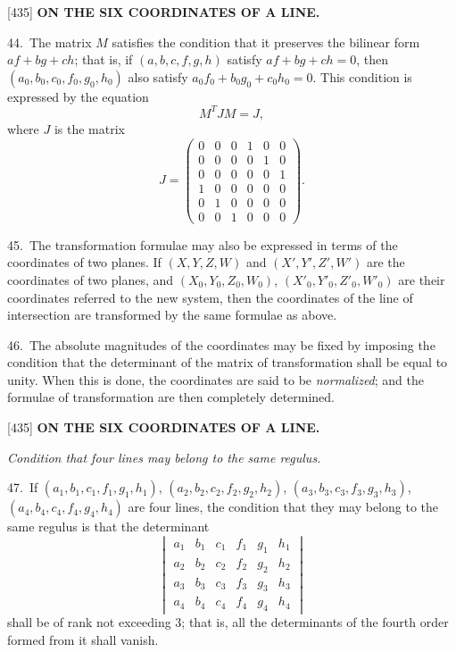 \documentclass[12pt,a4paper]{article}
\newcommand{\paperref}[1]{\textup{[#1]}}
\theoremstyle{definition}
\begin{document}
\noindent\paperref{435}\quad
\textbf{ON THE SIX COORDINATES OF A LINE.}

44.~The matrix $M$ satisfies the condition that it preserves the bilinear form $af + bg + ch$; that is, if $(a, b, c, f, g, h)$ satisfy $af + bg + ch = 0$, then $(a_0, b_0, c_0, f_0, g_0, h_0)$ also satisfy $a_0 f_0 + b_0 g_0 + c_0 h_0 = 0$. This condition is expressed by the equation
\[
M^T J M = J,
\]
where $J$ is the matrix
\[
J = \begin{pmatrix}
0 & 0 & 0 & 1 & 0 & 0 \\
0 & 0 & 0 & 0 & 1 & 0 \\
0 & 0 & 0 & 0 & 0 & 1 \\
1 & 0 & 0 & 0 & 0 & 0 \\
0 & 1 & 0 & 0 & 0 & 0 \\
0 & 0 & 1 & 0 & 0 & 0
\end{pmatrix}.
\]

45.~The transformation formulae may also be expressed in terms of the coordinates of two planes. If $(X, Y, Z, W)$ and $(X', Y', Z', W')$ are the coordinates of two planes, and $(X_0, Y_0, Z_0, W_0)$, $(X'_0, Y'_0, Z'_0, W'_0)$ are their coordinates referred to the new system, then the coordinates of the line of intersection are transformed by the same formulae as above.

46.~The absolute magnitudes of the coordinates may be fixed by imposing the condition that the determinant of the matrix of transformation shall be equal to unity. When this is done, the coordinates are said to be \textit{normalized}; and the formulae of transformation are then completely determined.

\newpage
\setcounter{page}{84}

\noindent\paperref{435}\quad
\textbf{ON THE SIX COORDINATES OF A LINE.}

\textit{Condition that four lines may belong to the same regulus.}

47.~If $(a_1, b_1, c_1, f_1, g_1, h_1)$, $(a_2, b_2, c_2, f_2, g_2, h_2)$, $(a_3, b_3, c_3, f_3, g_3, h_3)$, $(a_4, b_4, c_4, f_4, g_4, h_4)$ are four lines, the condition that they may belong to the same regulus is that the determinant
\[
\begin{vmatrix}
a_1 & b_1 & c_1 & f_1 & g_1 & h_1 \\
a_2 & b_2 & c_2 & f_2 & g_2 & h_2 \\
a_3 & b_3 & c_3 & f_3 & g_3 & h_3 \\
a_4 & b_4 & c_4 & f_4 & g_4 & h_4
\end{vmatrix}
\]
shall be of rank not exceeding 3; that is, all the determinants of the fourth order formed from it shall vanish.
\end{document}
